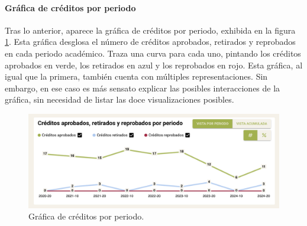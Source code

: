 \paragraph{Gráfica de créditos por periodo} Tras lo anterior, aparece la gráfica de créditos por periodo, exhibida en la figura \ref{fig:grafica_creditos}. Esta gráfica desglosa el número de créditos aprobados, retirados y reprobados en cada periodo académico. Traza una curva para cada uno, pintando los créditos aprobados en verde, los retirados en azul y los reprobados en rojo. Esta gráfica, al igual que la primera, también cuenta con múltiples representaciones. Sin embargo, en ese caso es más sensato explicar las posibles interacciones de la gráfica, sin necesidad de listar las doce visualizaciones posibles.

\begin{figure}[H]
	\includegraphics[width=\textwidth]{assets/nes/grafica_creditos.png}
	\caption{Gráfica de créditos por periodo.}
	\label{fig:grafica_creditos}
\end{figure}

